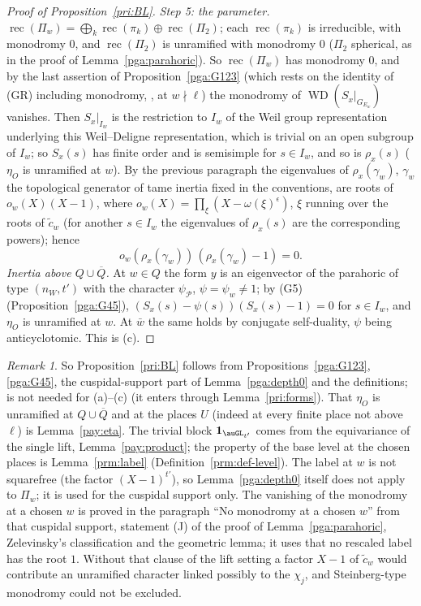 \documentclass[10pt]{amsart}
\theoremstyle{definition}
\theoremstyle{remark}
\newtheorem{remark}[theorem]{Remark}
\begin{document}
\begin{proof}[Proof of Proposition~\ref{pri:BL}]
\emph{Step 5: the parameter.} $\operatorname{rec}(\Pi_w)=\bigoplus_k\operatorname{rec}(\pi_k)\oplus
\operatorname{rec}(\Pi_2)$; each $\operatorname{rec}(\pi_k)$ is irreducible, with monodromy $0$, and
$\operatorname{rec}(\Pi_2)$ is unramified with monodromy $0$ ($\Pi_2$ spherical, as in the proof of
Lemma~\ref{pga:parahoric}). So $\operatorname{rec}(\Pi_w)$ has monodromy $0$, and by the last
assertion of Proposition~\ref{pga:G123} (which rests on the identity of (GR) including monodromy,
\cite[Thm.~2.1.1(2)]{BLGGT}, at $w\nmid\ell$) the monodromy of $\operatorname{WD}(S_x|_{G_{E_w}})$ vanishes. Then
$S_x|_{I_w}$ is the restriction to $I_w$ of the Weil group representation underlying this
Weil--Deligne representation, which is trivial on an open subgroup of $I_w$; so $S_x(s)$ has finite
order and is semisimple for $s\in I_w$, and so is $\rho_x(s)$ ($\eta_O$ is unramified at $w$). By the
previous paragraph the eigenvalues of $\rho_x(\gamma_w)$, $\gamma_w$ the topological generator of tame inertia fixed in the conventions, are roots of $o_w(X)(X-1)$, where $o_w(X)=\prod_\xi(X-\omega(\xi)^
\epsilon)$, $\xi$ running over the roots of $\tilde c_w$ (for another $s\in I_w$ the eigenvalues of $\rho_x(s)$ are the corresponding powers); hence
\[
o_w(\rho_x(\gamma_w))\,(\rho_x(\gamma_w)-1)=0 .
\]
\emph{Inertia above $Q\cup\overline Q$.} At $w\in Q$ the form $y$ is an eigenvector of the parahoric
of type $(n_W,t')$ with the character $\psi_{\mathcal P}$, $\psi=\psi_w\ne1$; by (G5)
(Proposition~\ref{pga:G45}), $(S_x(s)-\psi(s))(S_x(s)-1)=0$ for $s\in I_w$, and $\eta_O$ is unramified at
$w$. At $\bar w$ the same holds by conjugate self-duality, $\psi$ being anticyclotomic. This is (c).
\end{proof}

\begin{remark}\label{pax:rem-BL}
So Proposition~\ref{pri:BL} follows from Propositions~\ref{pga:G123}, \ref{pga:G45}, the
cuspidal-support part of Lemma~\ref{pga:depth0} and the definitions; {\cite[Lemma~14.5]{P46}} is not
needed for (a)--(c) (it enters through Lemma~\ref{pri:forms}). That $\eta_O$ is unramified at
$Q\cup\overline Q$ and at the places $U$ (indeed at every finite place not above $\ell$) is
Lemma~\ref{pay:eta}. The trivial block $\mathbf 1_{\auGL_{t'}}$ comes from the equivariance of the
single lift, Lemma~\ref{pay:product}; the property of the base level at the chosen places is
Lemma~\ref{prm:label} (Definition~\ref{prm:def-level}). The label at $w$ is not squarefree (the factor $(X-1)^{t'}$), so
Lemma~\ref{pga:depth0} itself does not apply to $\Pi_w$; it is used for the cuspidal support only.
The vanishing of the monodromy at a chosen $w$ is proved in the paragraph ``No monodromy at a chosen
$w$'' from that cuspidal support, statement (J) of the proof of Lemma~\ref{pga:parahoric}, Zelevinsky's
classification and the geometric lemma; it uses that no rescaled label has the root $1$. Without
that clause of the lift setting a factor $X-1$ of $\tilde c_w$ would contribute an unramified
character linked possibly to the $\chi_j$, and Steinberg-type monodromy could not be excluded.
\end{remark}
\end{document}
